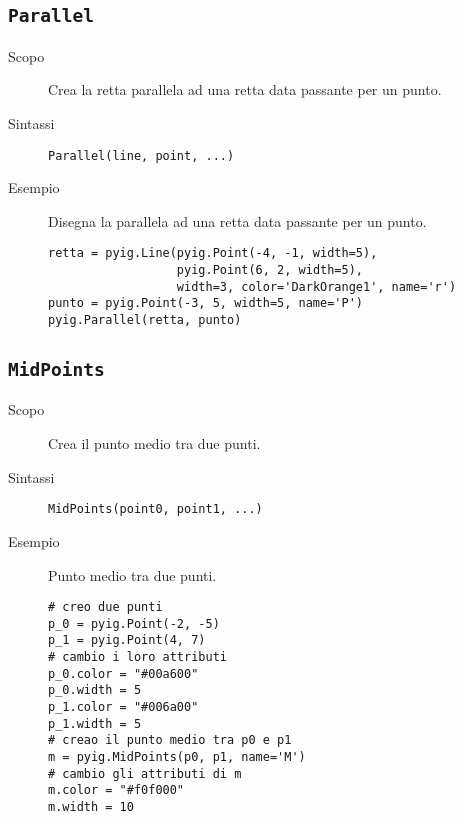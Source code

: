 \subsection{\lstinline{Parallel}}
\label{sub:geoint_parallel}

\begin{description}
 \item [Scopo] Crea la retta parallela ad una retta data passante per un punto.
 \item [Sintassi] \lstinline{Parallel(line, point, ...)}
% 
% 

 \item [Esempio] Disegna la parallela ad una retta data passante per un punto.
\begin{lstlisting}
retta = pyig.Line(pyig.Point(-4, -1, width=5), 
                  pyig.Point(6, 2, width=5), 
                  width=3, color='DarkOrange1', name='r')
punto = pyig.Point(-3, 5, width=5, name='P')
pyig.Parallel(retta, punto)
\end{lstlisting}

\end{description}

\subsection{\lstinline{MidPoints}}
\label{sub:geoint_midpoints}

\begin{description}
 \item [Scopo] Crea il punto medio tra due punti.
 \item [Sintassi] \lstinline{MidPoints(point0, point1, ...)}
% 

 \item [Esempio]Punto medio tra due punti.

\begin{lstlisting}
# creo due punti
p_0 = pyig.Point(-2, -5)
p_1 = pyig.Point(4, 7)
# cambio i loro attributi
p_0.color = "#00a600"
p_0.width = 5
p_1.color = "#006a00"
p_1.width = 5
# creao il punto medio tra p0 e p1
m = pyig.MidPoints(p0, p1, name='M')
# cambio gli attributi di m
m.color = "#f0f000"
m.width = 10
\end{lstlisting}

\end{description}

